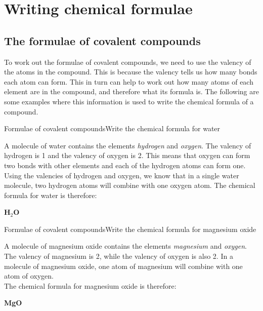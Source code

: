 






\section{Writing chemical formulae}

\subsection{The formulae of covalent compounds}

To work out the formulae of covalent compounds, we need to use the valency of the atoms in the compound. This is because the valency tells us how many bonds each atom can form. This in turn can help to work out how many atoms of each element are in the compound, and therefore what its formula is. The following are some examples where this information is used to write the chemical formula of a compound.

\begin{wex}{Formulae of covalent compounds}{Write the chemical formula for water}{
A molecule of water contains the elements \textit{hydrogen} and \textit{oxygen}.
The valency of hydrogen is 1 and the valency of oxygen is 2. This means that oxygen can form two bonds with other elements and each of the hydrogen atoms can form one.
Using the valencies of hydrogen and oxygen, we know that in a single water molecule, two hydrogen atoms will combine with one oxygen atom. The chemical formula for water is therefore:
\begin{center}
\textbf{H$_2$O}
\end{center}}
\end{wex}

\begin{wex}{Formulae of covalent compounds}{Write the chemical formula for magnesium oxide}{
A molecule of magnesium oxide contains the elements \textit{magnesium} and \textit{oxygen}.
The valency of magnesium is
2, while the valency of oxygen is also 2. In a molecule of magnesium oxide, one atom of magnesium will combine with one atom
of oxygen. \\
The chemical formula for magnesium oxide is therefore:

\begin{center}
\textbf{MgO}
\end{center}}
\end{wex}

